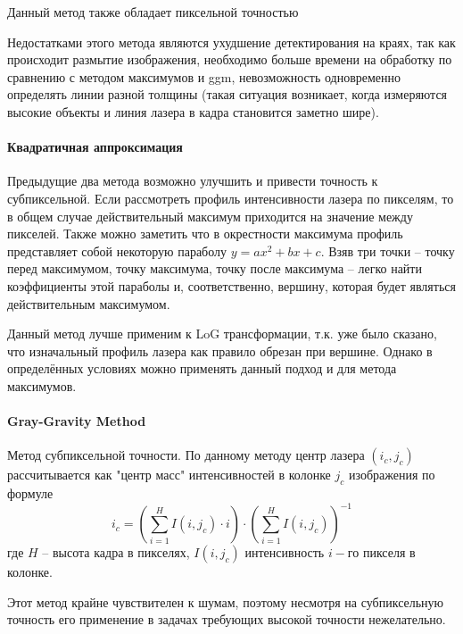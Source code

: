                 Данный метод также обладает пиксельной точностью
                
                Недостатками этого метода являются ухудшение детектирования на краях, так как происходит размытие изображения, необходимо больше времени на обработку по сравнению с методом максимумов и ggm, невозможность одновременно определять линии разной толщины (такая ситуация возникает, когда измеряются высокие объекты и линия лазера в кадра становится заметно шире).

            
            \paragraph{Квадратичная аппроксимация}
                Предыдущие два метода возможно улучшить и привести точность к субпиксельной\cite{Molder2014}. Если рассмотреть профиль интенсивности лазера по пикселям, то в общем случае действительный максимум приходится на значение между пикселей. Также можно заметить что в окрестности максимума профиль представляет собой некоторую параболу $ y = ax^2 + bx + c $. Взяв три точки -- точку перед максимумом, точку максимума, точку после максимума -- легко найти коэффициенты этой параболы и, соответственно, вершину, которая будет являться действительным максимумом.
                
                Данный метод лучше применим к LoG трансформации, т.к. уже было сказано, что изначальный профиль лазера как правило обрезан при вершине. Однако в определённых условиях можно применять данный подход и для метода максимумов.
            
            \paragraph{Gray-Gravity Method} 
                Метод субпиксельной точности\cite{Li2017}. 
                По данному методу центр лазера $ (i_c, j_c) $ рассчитывается как "центр масс" интенсивностей в колонке $ j_c $ изображения по формуле
                \begin{equation}
                    i_c = \left(\sum\limits_{i=1}^{H}I(i, j_c)\cdot i\right)\cdot\left(\sum\limits_{i=1}^{H}I(i, j_c)\right)^{-1}
                \end{equation}
                где $ H $ -- высота кадра в пикселях, $ I(i, j_c) $ интенсивность $ i-\textit{го} $ пикселя в колонке.
                
                Этот метод крайне чувствителен к шумам, поэтому несмотря на субпиксельную точность его применение в задачах требующих высокой точности нежелательно.
                
